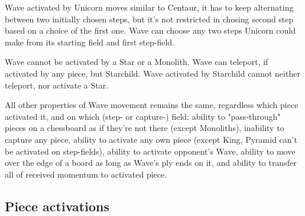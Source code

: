 Wave activated by Unicorn moves similar to Centaur, it has to keep alternating
between two initially chosen steps, but it's not restricted in chosing second step
based on a choice of the first one. Wave can choose any two steps Unicorn could
make from its starting field and first step-field.

Wave cannot be activated by a Star or a Monolith. Wave can teleport, if activated
by any piece, but Starchild. Wave activated by Starchild cannot neither teleport,
nor activate a Star.

All other properties of Wave movement remains the same, regardless which piece
activated it, and on which (step- or capture-) field: ability to "pass-through"
pieces on a chessboard as if they're not there (except Monoliths), inability to
capture any piece, ability to activate any own piece (except King, Pyramid can't
be activated on step-fields), ability to activate opponent's Wave, ability to move
over the edge of a board as long as Wave's ply ends on it, and ability to transfer
all of received momentum to activated piece.

\clearpage %

\subsection*{Piece activations}
\label{sec:Appendix/Summary/Piece activations}

